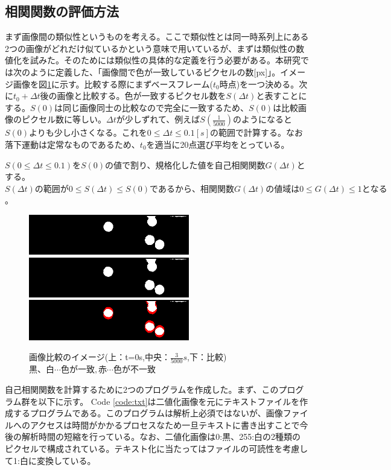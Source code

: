 \documentclass[a4paper,10pt,twocolumn,dvipdfmx]{jsarticle}
\begin{document}
\subsection{相関関数の評価方法}
まず画像間の類似性というものを考える。ここで類似性とは同一時系列上にある2つの画像がどれだけ似ているかという意味で用いているが、まずは類似性の数値化を試みた。そのためには類似性の具体的な定義を行う必要がある。本研究では次のように定義した、「画像間で色が一致しているピクセルの数[px]」。イメージ画像を図\ref{fig:exfall}に示す。比較する際にまずベースフレーム($t_0$時点)を一つ決める。次に$t_0+\Delta t$後の画像と比較する。色が一致するピクセル数を$S(\Delta t)$と表すことにする。$S(0)$は同じ画像同士の比較なので完全に一致するため、$S(0)$は比較画像のピクセル数に等しい。$\Delta t$が少しずれて、例えば$S(\frac{1}{5000})$のようになると$S(0)$よりも少し小さくなる。これを$0 \leq \Delta t \leq 0.1 [s]$の範囲で計算する。なお落下運動は定常なものであるため、$t_0$を適当に20点選び平均をとっている。 \par
$S(0 \leq \Delta t \leq 0.1)をS(0)$の値で割り、規格化した値を自己相関関数$G(\Delta t)$とする。$S(\Delta t)の範囲が0 \leq S(\Delta t) \leq S(0)であるから、相関関数G(\Delta t)の値域は0 \leq G(\Delta t) \leq 1となる$。
\begin{figure}[hbtp]
	\includegraphics[clip,width=7.0cm]{0.png}
	\includegraphics[clip,width=7.0cm]{3.png}
	\includegraphics[clip,width=7.0cm]{0and3.png}
	\caption{画像比較のイメージ(上：t=0s,中央：$\frac{3}{5000}s$,下：比較) \newline $黒、白 \cdots 色が一致 ,赤 \cdots 色が不一致$}
	\label{fig:exfall}
\end{figure}
自己相関関数を計算するために2つのプログラムを作成した。まず、このプログラム群を以下に示す。
Code \ref{code:txt}は二値化画像を元にテキストファイルを作成するプログラムである。このプログラムは解析上必須ではないが、画像ファイルへのアクセスは時間がかかるプロセスなため一旦テキストに書き出すことで今後の解析時間の短縮を行っている。なお、二値化画像は0:黒、255:白の2種類のピクセルで構成されている。テキスト化に当たってはファイルの可読性を考慮して1:白に変換している。
\end{document}
